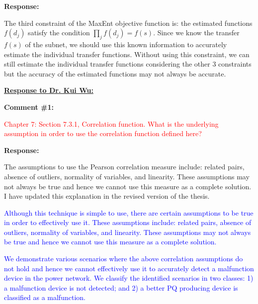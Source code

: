\documentclass[journal]{IEEEtran}
\begin{document}
\vspace{10pt}
\textbf{Response:}
\begin{adjustwidth}{2.5em}{0pt}
The third constraint of the MaxEnt objective function is: the estimated functions $f(d_j)$ satisfy the condition $\prod_j f(d_j) = f(s)$. Since we know the transfer $f(s)$ of the subnet, we should use this known information to accurately estimate the individual transfer functions. Without using this constraint, we can still estimate the individual transfer functions considering the other 3 constraints but the accuracy of the estimated functions may not always be accurate.
\end{adjustwidth} 
 
 
 
 
 
\vspace{50pt}
  \Large
\noindent \textbf{\underline{Response to Dr. Kui Wu:}}
 \large

\vspace{10pt}
\textbf{Comment \#1:}
\begin{adjustwidth}{2.5em}{0pt}
\singlespacing \vspace{-10pt}
\textcolor{red}{Chapter 7: Section 7.3.1, Correlation function. What is the underlying assumption in order to use the correlation function defined here?}
\end{adjustwidth}

\vspace{10pt}
\textbf{Response:}
\begin{adjustwidth}{2.5em}{0pt}
The assumptions to use the Pearson correlation measure include: related pairs, absence of outliers, normality of variables, and linearity. These assumptions may not always be true and hence we cannot use this measure as a complete solution. I have updated this explanation in the revised version of the thesis.

\vspace{10pt}
\noindent\textcolor{blue}{Although this technique is simple to use, there are certain assumptions to be true in order to effectively use it. These assumptions include: related pairs, absence of outliers, normality of variables, and linearity. These assumptions may not always be true and hence we cannot use this measure as a complete solution.}

\vspace{10pt}
\noindent\textcolor{blue}{We demonstrate various scenarios where the above correlation assumptions do not hold and hence we cannot effectively use it to accurately detect a malfunction device in the power network. We classify the identified scenarios in two classes: 1) a malfunction device is not detected; and 2) a better PQ producing device is classified as a malfunction.}
\end{adjustwidth}
\end{document}
